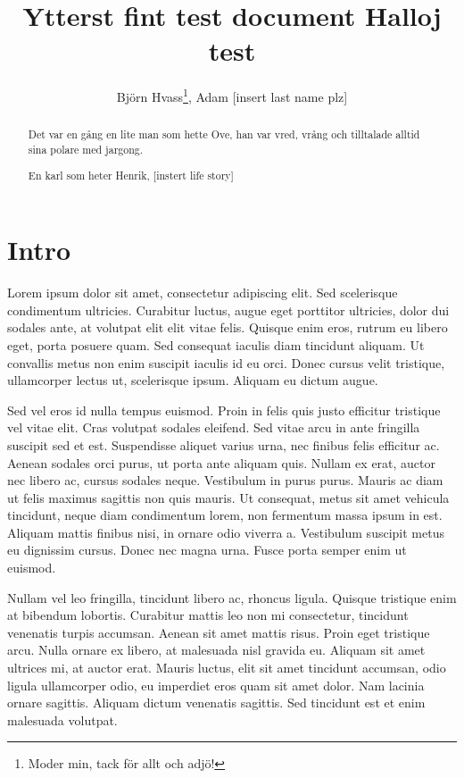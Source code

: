 \documentclass[a4paper,10pt]{article}
\title{Ytterst fint test document Halloj test}
\author{Björn Hvass\thanks{Moder min, tack för allt och adjö!}, Adam [insert last name plz]}
\begin{document}
\maketitle

\begin{abstract}
Det var en gång en lite man som hette Ove, han var vred, vrång och tilltalade alltid sina polare med jargong.

En karl som heter Henrik, [instert life story]
\end{abstract}

\section{Intro}\label{sec:Intro}
Lorem ipsum dolor sit amet, consectetur adipiscing elit. Sed scelerisque condimentum ultricies. Curabitur luctus, augue eget porttitor ultricies, dolor dui sodales ante, at volutpat elit elit vitae felis. Quisque enim eros, rutrum eu libero eget, porta posuere quam. Sed consequat iaculis diam tincidunt aliquam. Ut convallis metus non enim suscipit iaculis id eu orci. Donec cursus velit tristique, ullamcorper lectus ut, scelerisque ipsum. Aliquam eu dictum augue.

Sed vel eros id nulla tempus euismod. Proin in felis quis justo efficitur tristique vel vitae elit. Cras volutpat sodales eleifend. Sed vitae arcu in ante fringilla suscipit sed et est. Suspendisse aliquet varius urna, nec finibus felis efficitur ac. Aenean sodales orci purus, ut porta ante aliquam quis. Nullam ex erat, auctor nec libero ac, cursus sodales neque. Vestibulum in purus purus. Mauris ac diam ut felis maximus sagittis non quis mauris. Ut consequat, metus sit amet vehicula tincidunt, neque diam condimentum lorem, non fermentum massa ipsum in est. Aliquam mattis finibus nisi, in ornare odio viverra a. Vestibulum suscipit metus eu dignissim cursus. Donec nec magna urna. Fusce porta semper enim ut euismod.

Nullam vel leo fringilla, tincidunt libero ac, rhoncus ligula. Quisque tristique enim at bibendum lobortis. Curabitur mattis leo non mi consectetur, tincidunt venenatis turpis accumsan. Aenean sit amet mattis risus. Proin eget tristique arcu. Nulla ornare ex libero, at malesuada nisl gravida eu. Aliquam sit amet ultrices mi, at auctor erat. Mauris luctus, elit sit amet tincidunt accumsan, odio ligula ullamcorper odio, eu imperdiet eros quam sit amet dolor. Nam lacinia ornare sagittis. Aliquam dictum venenatis sagittis. Sed tincidunt est et enim malesuada volutpat.
\end{document}
